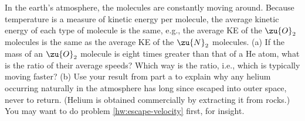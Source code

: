 In the earth's atmosphere, the molecules are constantly
moving around. Because temperature is a measure of kinetic
energy per molecule, the average kinetic energy of each type
of molecule is the same, e.g., the average KE of the $\zu{O}_2$
molecules is the same as the average KE of the $\zu{N}_2$
molecules. (a) If the mass of an $\zu{O}_2$ molecule is eight
times greater than that of a He atom, what is the ratio of
their average speeds? Which way is the ratio, i.e., which is
typically moving faster? (b) Use your result from part a to
explain why any helium occurring naturally in the atmosphere
has long since escaped into outer space, never to return.
(Helium is obtained commercially by extracting it from rocks.)
You may want to do problem \ref{hw:escape-velocity} first,
for insight.
